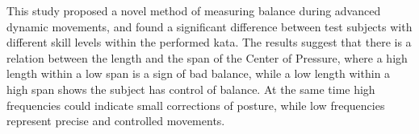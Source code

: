 


This study proposed a novel method of measuring balance during advanced dynamic movements, and found a significant difference between test subjects with different skill levels within the performed kata. The results suggest that there is a relation between the length and the span of the Center of Pressure, where a high length within a low span is a sign of bad balance, while a low length within a high span shows the subject has control of balance. At the same time high frequencies could indicate small corrections of posture, while low frequencies represent precise and controlled movements. 
